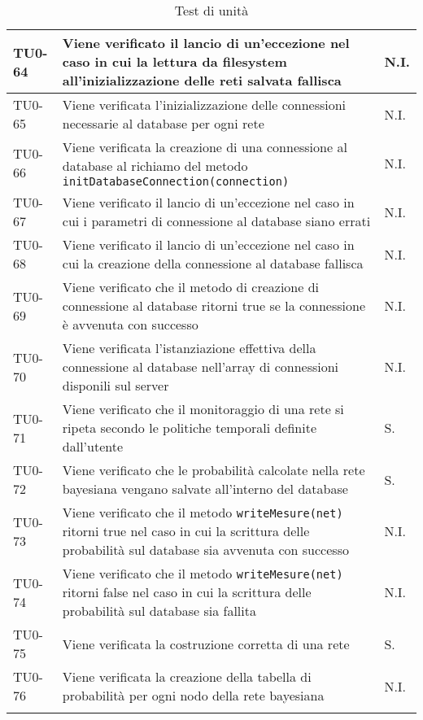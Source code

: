 \begin{longtable}{|C{.15\textwidth}|m{.65\textwidth}|C{.20\textwidth}|}
\hline
{}TU0-64 & Viene verificato il lancio di un'eccezione nel caso in cui la lettura da filesystem all'inizializzazione delle reti salvata fallisca & N.I. \\ 
\hline
TU0-65 & Viene verificata l'inizializzazione delle connessioni necessarie al database per ogni rete & N.I. \\ 
\hline
{}TU0-66 &  Viene verificata la creazione di una connessione al database al richiamo del metodo \texttt{initDatabaseConnection(connection)} & N.I.\\ 
\hline
TU0-67 & Viene verificato il lancio di un'eccezione nel caso in cui i parametri di connessione al database siano errati & N.I. \\
\hline
{} TU0-68 & Viene verificato il lancio di un'eccezione nel caso in cui la creazione della connessione al database fallisca & N.I. \\ 
\hline
TU0-69 & Viene verificato che il metodo di creazione di connessione al database ritorni true se la connessione è avvenuta con successo & N.I. \\ 
\hline 
{} TU0-70 & Viene verificata l'istanziazione effettiva della connessione al database nell'array di connessioni disponili sul server & N.I. \\ 
\hline 
TU0-71 & Viene verificato che il monitoraggio di una rete si ripeta secondo le politiche temporali definite dall'utente & S. \\ 
\hline 
{} TU0-72 & Viene verificato che le probabilità calcolate nella rete bayesiana vengano salvate all'interno del database  & S. \\ 
\hline 
TU0-73 & Viene verificato che il metodo \texttt{writeMesure(net)}  ritorni true nel caso in cui la scrittura delle probabilità sul database sia avvenuta con successo & N.I. \\
\hline
{}TU0-74 & Viene verificato che il metodo \texttt{writeMesure(net)} ritorni false nel caso in cui la scrittura delle probabilità sul database sia fallita & N.I. \\ 
\hline
TU0-75 & Viene verificata la costruzione corretta di una rete & S.  \\ 
\hline 
{}TU0-76 & Viene verificata la creazione della tabella di probabilità per ogni nodo della rete bayesiana & N.I. \\ 
\hline

\caption{Test di unità}
\label{testunita}
\end{longtable}




























